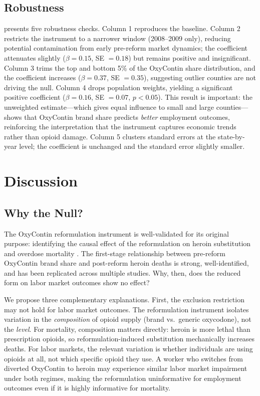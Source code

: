 \documentclass[12pt]{article}
\begin{document}


\subsection{Robustness}

 presents five robustness checks. Column 1 reproduces the baseline. Column 2 restricts the instrument to a narrower window (2008--2009 only), reducing potential contamination from early pre-reform market dynamics; the coefficient attenuates slightly ($\beta = 0.15$, SE $= 0.18$) but remains positive and insignificant. Column 3 trims the top and bottom 5\% of the OxyContin share distribution, and the coefficient increases ($\beta = 0.37$, SE $= 0.35$), suggesting outlier counties are not driving the null. Column 4 drops population weights, yielding a significant positive coefficient ($\beta = 0.16$, SE $= 0.07$, $p < 0.05$). This result is important: the unweighted estimate---which gives equal influence to small and large counties---shows that OxyContin brand share predicts \textit{better} employment outcomes, reinforcing the interpretation that the instrument captures economic trends rather than opioid damage. Column 5 clusters standard errors at the state-by-year level; the coefficient is unchanged and the standard error slightly smaller.




\section{Discussion}
\label{sec:discussion}

\subsection{Why the Null?}

The OxyContin reformulation instrument is well-validated for its original purpose: identifying the causal effect of the reformulation on heroin substitution and overdose mortality \citep{alpert2018, evans2019}. The first-stage relationship between pre-reform OxyContin brand share and post-reform heroin deaths is strong, well-identified, and has been replicated across multiple studies. Why, then, does the reduced form on labor market outcomes show no effect?

We propose three complementary explanations. First, the exclusion restriction may not hold for labor market outcomes. The reformulation instrument isolates variation in the \textit{composition} of opioid supply (brand vs.\ generic oxycodone), not the \textit{level}. For mortality, composition matters directly: heroin is more lethal than prescription opioids, so reformulation-induced substitution mechanically increases deaths. For labor markets, the relevant variation is whether individuals are using opioids at all, not which specific opioid they use. A worker who switches from diverted OxyContin to heroin may experience similar labor market impairment under both regimes, making the reformulation uninformative for employment outcomes even if it is highly informative for mortality.
\end{document}
